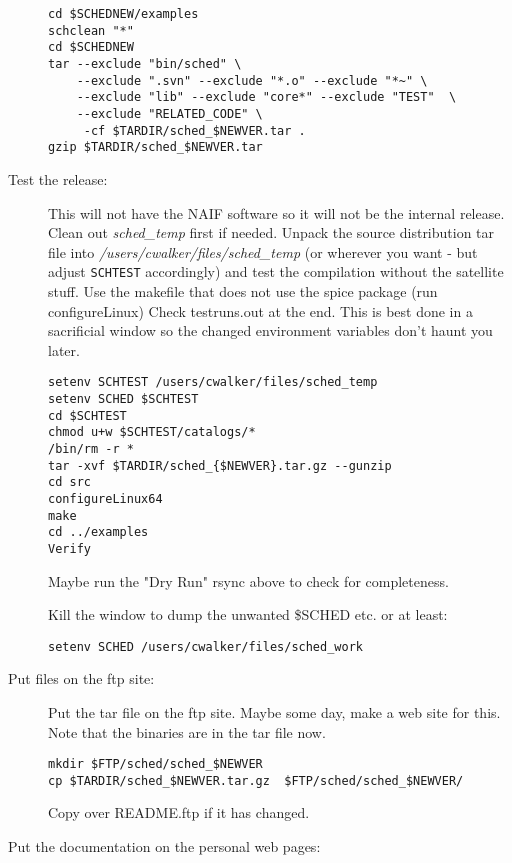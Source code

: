 \documentclass{report}
\begin{document}
\begin{description}
\begin{verbatim}
cd $SCHEDNEW/examples
schclean "*"
cd $SCHEDNEW
tar --exclude "bin/sched" \
    --exclude ".svn" --exclude "*.o" --exclude "*~" \
    --exclude "lib" --exclude "core*" --exclude "TEST"  \
    --exclude "RELATED_CODE" \
     -cf $TARDIR/sched_$NEWVER.tar .
gzip $TARDIR/sched_$NEWVER.tar
\end{verbatim}


\item [Test the release:]

This will not have the NAIF software so it will not be the internal
release.  Clean out {\sl sched\_temp} first if needed.  Unpack the
source distribution tar file into {\sl
/users/cwalker/files/sched\_temp} (or wherever you want - but adjust
{\tt SCHTEST} accordingly) and test the compilation without the
satellite stuff.  Use the makefile that does not use the spice package
(run configureLinux) Check testruns.out at the end.  This is best done
in a sacrificial window so the changed environment variables don't
haunt you later.

\begin{verbatim}
setenv SCHTEST /users/cwalker/files/sched_temp
setenv SCHED $SCHTEST
cd $SCHTEST
chmod u+w $SCHTEST/catalogs/*
/bin/rm -r *
tar -xvf $TARDIR/sched_{$NEWVER}.tar.gz --gunzip
cd src
configureLinux64
make
cd ../examples
Verify
\end{verbatim}


Maybe run the "Dry Run" rsync above to check for completeness.

     Kill the window to dump the unwanted \$SCHED etc. or at least:
\begin{verbatim}
setenv SCHED /users/cwalker/files/sched_work
\end{verbatim}


\item [Put files on the ftp site:]

Put the tar file on the ftp site.  Maybe some day, make a web site
for this.   Note that the binaries are in the tar
file now.

\begin{verbatim}
mkdir $FTP/sched/sched_$NEWVER
cp $TARDIR/sched_$NEWVER.tar.gz  $FTP/sched/sched_$NEWVER/
\end{verbatim}

Copy over README.ftp if it has changed.

\item [Put the documentation on the personal web pages:]


\end{description}
\end{document}
